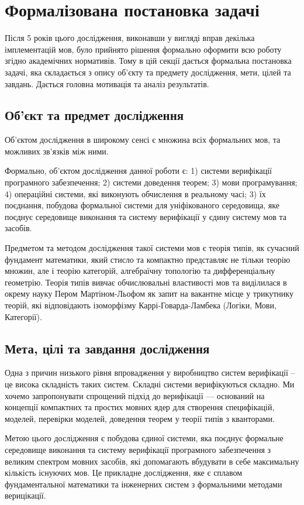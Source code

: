 \section{Формалізована постановка задачі}
Після 5 років цього дослідження, виконавши у вигляді вправ декілька імплементацій мов,
було прийнято рішення формально оформити всю роботу згідно академічних нормативів.
Тому в цій секції дається формальна постановка задачі, яка складається з опису
об'єкту та предмету дослідження, мети, цілей та завдань.
Дається головна мотивація та аналіз результатів.

\subsection{Об'єкт та предмет дослідження}
Об'єктом дослідження в широкому сенсі є множина
всіх формальних мов, та можливих зв'язків між ними.

Формально, об'єктом дослідження данної роботи є:
1) системи верифікації програмного забезпечення;
2) системи доведення теорем;
3) мови програмування;
4) операційні системи, які виконують обчислення в реальному часі;
3) їх поєднання, побудова формальної системи для
уніфікованого середовища, яке поєднує середовище
виконання та систему верифікації у єдину систему мов та засобів.

Предметом та методом дослідження такої системи мов є теорія типів,
як сучасний фундамент математики,
який стисло та компактно представляє не тільки теорію множин,
але і теорію категорій, алгебраїчну топологію та дифференціальну геометрію.
Теорія типів вивчає обчислювальні властивості мов та виділилася
в окрему науку Пером Мартіном-Льофом як запит на вакантне місце у
трикутнику теорій, які відповідають ізоморфізму
Каррі-Говарда-Ламбека (Логіки, Мови, Категорії).

\subsection{Мета, цілі та завдання дослідження}
Одна з причин низького рівня впровадження у виробництво систем
верифікації -- це висока складність таких систем. Складні системи
верифікуються складно. Ми хочемо запропонувати спрощений
підхід до верифікації --- оснований на концепції компактних
та простих мовних ядер для створення специфікацій, моделей,
перевірки моделей, доведення теорем у теорії типів з кванторами.

Метою цього дослідження є побудова єдиної системи, яка поєднує формальне середовище
виконання та систему верифікації програмного забезпечення з великим спектром мовних
засобів, які допомагають вбудувати в себе максимальну кількість існуючих мов.
Це прикладне дослідження, яке є сплавом фундаментальної математики та інженерних
систем з формальними методами верицікації.

